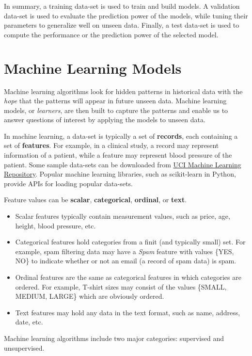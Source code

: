 \documentclass[11pt]{article}
\begin{document}
In summary, a training data-set is used to train and build models. A validation data-set is used to evaluate the prediction power of the models, while tuning their parameters to generalize well on unseen data. Finally, a test data-set is used to compute the performance or the prediction power of the selected model.

\section{Machine Learning Models}
\label{sec:orgheadline2}
Machine learning algorithms look for hidden patterns in historical data with the \emph{hope} that the patterns will appear in future unseen data. Machine learning models, or \emph{learners}, are then built to capture the patterns and enable us to answer questions of interest by applying the models to unseen data. 

In machine learning, a data-set is typically a set of \textbf{records}, each containing a set of \textbf{features}. For example, in a clinical study, a record may represent information of a patient, while a feature may represent blood pressure of the patient. Some sample data-sets can be downloaded from \href{https://archive.ics.uci.edu/ml/index.php}{UCI Machine Learning Repository}. Popular machine learning libraries, such as scikit-learn in Python, provide APIs for loading popular data-sets.

Feature values can be \textbf{scalar}, \textbf{categorical}, \textbf{ordinal}, or \textbf{text}. 
\begin{itemize}
\item Scalar features typically contain measurement values, such as price, age, height, blood pressure, etc.
\item Categorical features hold categories from a finit (and typically small) set. For example, spam filtering data may have a \emph{Spam} feature with values \{YES, NO\} to indicate whether or not an email (a record of spam data) is spam.
\item Ordinal features are the same as categorical features in which categories are ordered. For example, T-shirt sizes may consist of the values \{SMALL, MEDIUM, LARGE\} which are obviously ordered.
\item Text features may hold any data in the text format, such as name, address, date, etc.
\end{itemize}

Machine learning algorithms include two major categories: supervised and unsupervised.
\end{document}
